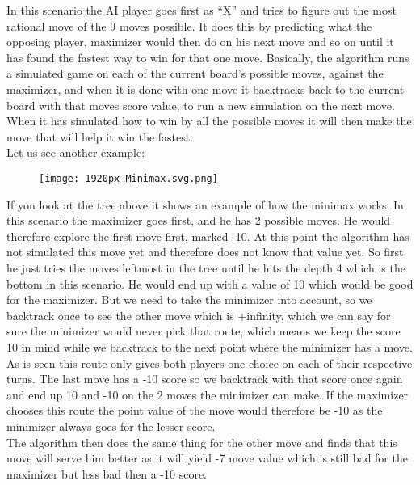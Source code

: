 In this scenario the AI player goes first as “X” and tries to figure out the most rational move of the 9 moves possible. 
It does this by predicting what the opposing player, maximizer would then do on his next move and so on until it has found the fastest way to win for that one move. 
Basically, the algorithm runs a simulated game on each of the current board’s possible moves, against the maximizer, 
and when it is done with one move it backtracks back to the current board with that moves score value, to run a new simulation on the next move. 
When it has simulated how to win by all the possible moves it will then make the move that will help it win the fastest.\\

Let us see another example:\\
\begin{figure}
    \texttt{[image: 1920px-Minimax.svg.png]}\\
    \label{fig:Tree Example}
\end{figure}

If you look at the tree above it shows an example of how the minimax works. In this scenario the maximizer goes first, and he has 2 possible moves. 
He would therefore explore the first move first, marked -10. At this point the algorithm has not simulated this move yet and therefore does not know that value yet. 
So first he just tries the moves leftmost in the tree until he hits the depth 4 which is the bottom in this scenario. He would end up with a value of 10 which would be good for the maximizer. 
But we need to take the minimizer into account, so we backtrack once to see the other move which is +infinity, 
which we can say for sure the minimizer would never pick that route, which means we keep the score 10 in mind while we backtrack to the next point where the minimizer has a move. 
As is seen this route only gives both players one choice on each of their respective turns. 
The last move has a -10 score so we backtrack with that score once again and end up 10 and -10 on the 2 moves the minimizer can make. 
If the maximizer chooses this route the point value of the move would therefore be -10 as the minimizer always goes for the lesser score.\\
The algorithm then does the same thing for the other move and finds that this move will serve him better as it will yield -7 move value which is still bad for the maximizer but less bad then a -10 score.


